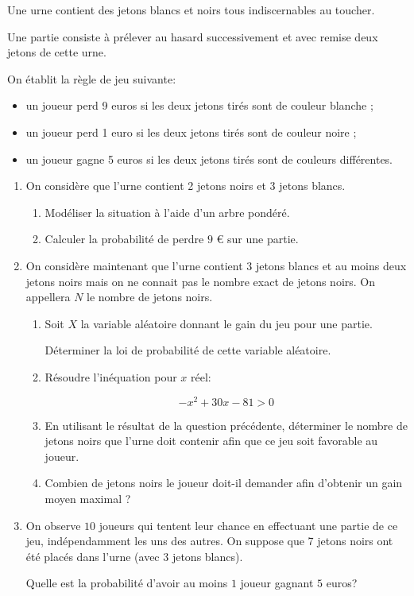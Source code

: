 \medskip

Une urne contient des jetons blancs et noirs tous indiscernables au toucher.

Une partie consiste à prélever au hasard successivement et avec remise deux jetons de cette urne.

On établit la règle de jeu suivante:

\setlength\parindent{1cm}
\begin{itemize}
\item[$\bullet~~$] un joueur perd 9 euros si les deux jetons tirés sont de couleur blanche ;
\item[$\bullet~~$] un joueur perd 1 euro si les deux jetons tirés sont de couleur noire ;
\item[$\bullet~~$] un joueur gagne 5 euros si les deux jetons tirés sont de couleurs différentes.
\end{itemize}
\setlength\parindent{0cm}

\medskip

\begin{enumerate}
\item On considère que l'urne contient 2 jetons noirs et 3 jetons blancs.
	\begin{enumerate}
		\item Modéliser la situation à l'aide d'un arbre pondéré.
		\item Calculer la probabilité de perdre $9$ \euro{} sur une partie.
	\end{enumerate}	
\item On considère maintenant que l'urne contient 3 jetons blancs et au moins deux jetons noirs mais on ne connait pas le nombre exact de jetons noirs. On appellera $N$ le nombre de jetons noirs.
	\begin{enumerate}
		\item Soit $X$ la variable aléatoire donnant le gain du jeu pour une partie.
		
Déterminer la loi de probabilité de cette variable aléatoire.
		\item Résoudre l'inéquation pour $x$ réel:
		
\[-x^2  + 30x - 81 > 0\]

		\item En utilisant le résultat de la question précédente, déterminer le nombre de jetons noirs que l'urne doit contenir afin que ce jeu soit favorable au joueur.
		\item Combien de jetons noirs le joueur doit-il demander afin d'obtenir un gain moyen maximal ?
	\end{enumerate}
\item On observe $10$ joueurs qui tentent leur chance en effectuant une partie de ce jeu, indépendamment les uns des autres. On suppose que 7 jetons noirs ont été placés dans l'urne (avec 3 jetons blancs). 

Quelle est la probabilité d'avoir au moins $1$ joueur gagnant $5$ euros?
\end{enumerate}
